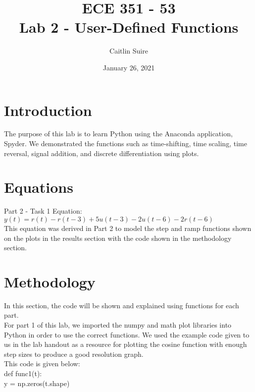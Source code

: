 \documentclass[12pt]{report}
\title{\myfont \textbf{ ECE 351 - 53 \\ \bigskip Lab 2 - User-Defined Functions}}
\author{Caitlin Suire}
\date{January 26, 2021}   %
\begin{document}
\maketitle

\thispagestyle{empty}

\newpage

\tableofcontents
\pagebreak


\section{Introduction}

The purpose of this lab is to learn Python using the Anaconda application, Spyder. We demonstrated the functions such as time-shifting, time scaling, time reversal, signal addition, and discrete differentiation using plots. 

\section{Equations}

Part 2 - Task 1 Equation: \\

$ y(t) = r(t) - r(t-3) + 5u(t-3) -2u(t-6) -2r(t-6) $ \\

\noindent This equation was derived in Part 2 to model the step and ramp functions shown on the plots in the results section with the code shown in the methodology section. 

\section{Methodology}
In this section, the code will be shown and explained using functions for each part.\\

\noindent For part 1 of this lab, we imported the numpy and math plot libraries into Python in order to use the correct functions. We used the example code given to us in the lab handout as a resource for plotting the cosine function with enough step sizes to produce a good resolution graph. \\ 
This code is given below: \\

\indent def func1(t):\\         %
\indent \indent y = np.zeros(t.shape)\\
    
\end{document}
